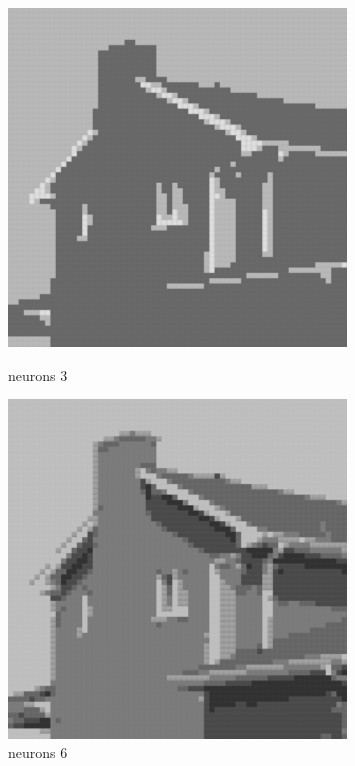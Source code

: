 \documentclass[../IDP_Task5_Karwowski_Kowalewski.tex]{subfiles}
\begin{document}
{{        \begin{figure}[!htbp]
            \begin{minipage}[c]{0.45\linewidth}
                \centering
                \includegraphics[width=0.8\textwidth]{img/kowalewski/crop_size_4_neurons_3.png}
                \caption{neurons 3}
            \end{minipage}\hfill
            \begin{minipage}[c]{0.45\linewidth}
                \centering
                \includegraphics[width=0.8\textwidth]{img/kowalewski/crop_size_4_neurons_6.png}
                \caption{neurons 6}
            \end{minipage}
        \end{figure}

}}
\end{document}
